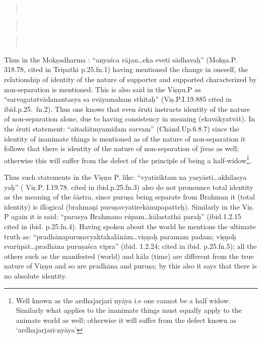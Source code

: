 \begin{verse}
\\
\end{verse}
\begin{verse}
\\
\end{verse}
\begin{verse}
\\
\end{verse}

Thus in the Mokṣadharma : “anyaśca rājan…eka eveti sādhavaḥ” (Mokṣa.P. 318.78, cited in Tripathi p.25.fn.1)  having mentioned the change in oneself, the relationship of identity of the nature of supporter and supported characterized by non-separation is mentioned.  This is also said in the Viṣṇu.P as “sarvagatatvādanantasya sa evāyamaham sthitaḥ” (Viṣ.P.I.19.885 cited in ibid.p.25.~fn.2).   Thus one knows that even śruti instructs identity of the nature of non-separation alone, due to having consistency in meaning (ekavākyatvāt). In the śruti statement: “aitadātmyamidam sarvam” (Chānd.Up.6.8.7) since the identity of inanimate things is mentioned as of the nature of non-separation it follows that there is identity of the nature of non-separation of jīvas as well; otherwise this will suffer from the defect of the principle of being a half-widow\footnote{Well known as the ardhajarjarī nyāya i.e one cannot be a half widow. Similarly what applies to the inanimate things must equally apply to the animate world as well; otherwise it will suffer from the defect known as ‘ardhajarjarī-nyāya’}. 

Thus such statements in the Viṣṇu P. like: “vyatiriktam na yasyāsti…akhilasya yaḥ” ( Viṣ.P. I.19.78. cited in ibid.p.25.fn.3) also do not pronounce total identity as the meaning of the śāstra, since puruṣa being separate from Brahman it (total identity) is illogical (brahmaṇi puruṣavyatirekānupapatteḥ). Similarly in the Viṣ. P again it is said: “parasya Brahmano rūpam…kālastathā paraḥ” (ibid.1.2.15 cited in ibid. p.25.fn.4). Having spoken about the world he mentions the ultimate truth as: “pradhānapuruṣavyaktakalānām…viṣṇoḥ paramam padam; viṣṇoḥ svarūpāt…pradhāna puruṣaśca vipra” (ibid. 1.2.24; cited in ibid. p.25.fn.5); all the others such as the manifested (world) and kāla (time) are different from the true nature of Viṣṇu and so are pradhāna and puruṣa; by this also it says that there is no absolute identity. 

